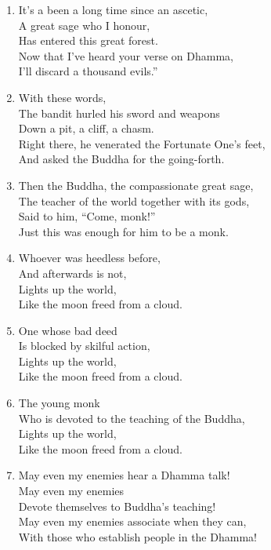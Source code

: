 \documentclass[10pt, openany]{book}
\newcommand*{\vleftofline}[1]{\leavevmode\llap{#1}}
\begin{document}
\begin{enumerate}
\item \vleftofline{“}It’s a been a long time since an ascetic,\\
A great sage who I honour, \\
Has entered this great forest.\\
Now that I’ve heard your verse on Dhamma,\\
I’ll discard a thousand evils.”

\item With these words, \\
The bandit hurled his sword and weapons\\
Down a pit, a cliff, a chasm.\\
Right there, he venerated the Fortunate One’s feet,\\
And asked the Buddha for the going-forth.

\item Then the Buddha, the compassionate great sage,\\
The teacher of the world together with its gods,\\
Said to him, “Come, monk!”\\
Just this was enough for him to be a monk.

\item \vleftofline{“}Whoever was heedless before,\\
And afterwards is not,\\
Lights up the world,\\
Like the moon freed from a cloud.

\item One whose bad deed\\
Is blocked by skilful action,\\
Lights up the world,\\
Like the moon freed from a cloud.

\item The young monk\\
Who is devoted to the teaching of the Buddha,\\
Lights up the world,\\
Like the moon freed from a cloud.

\item May even my enemies hear a Dhamma talk!\\
May even my enemies \\
Devote themselves to Buddha’s teaching!\\
May even my enemies associate when they can,\\
With those who establish people in the Dhamma!


\end{enumerate}
\end{document}
